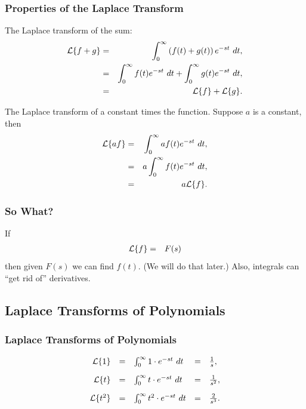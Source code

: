 \begin{frame}
  \frametitle{Properties of the Laplace Transform}

  The Laplace transform of the sum:
  \begin{eqnarray*}
    \laplace{f+g} & = & \int^\infty_0 \lp f(t) + g(t) \rp e^{-st} ~ dt, \\
    & = & \int^\infty_0 f(t) e^{-st} ~ dt + \int^\infty_0 g(t) e^{-st} ~ dt, \\
    & = & \laplace{f} + \laplace{g}.
  \end{eqnarray*}

  
  The Laplace transform of a constant times the function. Suppose $a$ is a constant, then
  \begin{eqnarray*}
    \laplace{a f} & = & \int^\infty_0 a f(t) e^{-st} ~ dt, \\
    & = & a \int^\infty_0 f(t) e^{-st} ~ dt, \\
    & = & a \laplace{f}.
  \end{eqnarray*}


\end{frame}


\begin{frame}
  \frametitle{So What?}

  If 
  \begin{eqnarray*}
    \laplace{f} & = & F(s)
  \end{eqnarray*}
  then given $F(s)$ we can find $f(t)$. (We will do that later.) Also,
  integrals can ``get rid of'' derivatives.

\end{frame}

\subsection{Laplace Transforms of Polynomials}

\begin{frame}
  \frametitle{Laplace Transforms of Polynomials}

  \begin{eqnarray*}
    \begin{array}{rcl@{\hspace{1em}}c@{\hspace{1em}}l}
    \laplace{1} & = & \int^\infty_0 1 \cdot e^{-st} ~ dt
    & = & \frac{1}{s}, \\ [10pt]
    \laplace{t} & = & \int^\infty_0 t \cdot e^{-st} ~ dt
    & = & \frac{1}{s^2}, \\ [10pt]
    \laplace{t^2} & = & \int^\infty_0 t^2 \cdot e^{-st} ~ dt
    & = & \frac{2}{s^3}.      
    \end{array}
  \end{eqnarray*}

\end{frame}



